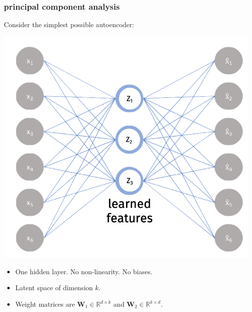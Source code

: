 \documentclass[handout,compress]{beamer}
\newcommand{\bv}[1]{\mathbf{#1}}
\newcommand{\R}{\mathbb{R}}
\begin{document}
\begin{frame}
	\frametitle{principal component analysis}
	\small
	Consider the simplest possible autoencoder:
	\begin{center}
		\includegraphics[width=.5\textwidth]{bottleneck.png}
	\end{center}
	\begin{itemize}
		\item One hidden layer. No non-linearity. No biases.
		\item Latent space of dimension $k$. 
		\item Weight matrices are $\bv{W}_1\in \R^{d\times k}$ and $\bv{W}_2\in \R^{k\times d}$. 
	\end{itemize}
\end{frame}
\end{document}
